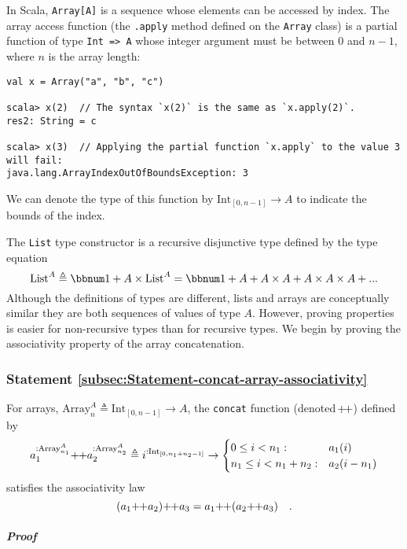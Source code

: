 In Scala, \lstinline!Array[A]! is a sequence whose elements can be
accessed by index. The array access function (the \lstinline!.apply!
method defined on the \lstinline!Array! class) is a partial function
of type \lstinline!Int => A! whose integer argument must be between
$0$ and $n-1$, where $n$ is the array length:
\begin{lstlisting}
val x = Array("a", "b", "c")

scala> x(2)  // The syntax `x(2)` is the same as `x.apply(2)`. 
res2: String = c

scala> x(3)  // Applying the partial function `x.apply` to the value 3 will fail:
java.lang.ArrayIndexOutOfBoundsException: 3
\end{lstlisting}
We can denote the type of this function by $\text{Int}_{[0,n-1]}\rightarrow A$
to indicate the bounds of the index.

The \lstinline!List! type constructor is a recursive disjunctive
type defined by the type equation
\[
\text{List}^{A}\triangleq\bbnum 1+A\times\text{List}^{A}=\bbnum 1+A+A\times A+A\times A\times A+...
\]
Although the definitions of types are different, lists and arrays
are conceptually similar \textemdash{} they are both sequences of
values of type $A$. However, proving properties is easier for non-recursive
types than for recursive types. We begin by proving the associativity
property of the array concatenation. 

\subsubsection{Statement \label{subsec:Statement-concat-array-associativity}\ref{subsec:Statement-concat-array-associativity}}

For arrays, $\text{Array}_{n}^{A}\triangleq\text{Int}_{[0,n-1]}\rightarrow A$,
the \lstinline!concat! function (denoted $\negmedspace+\!+$) defined
by
\[
a_{1}^{:\text{Array}_{n_{1}}^{A}}\negmedspace+\negthickspace+a_{2}^{:\text{Array}_{n_{2}}^{A}}\triangleq i^{:\text{Int}_{[0,n_{1}+n_{2}-1]}}\rightarrow\begin{cases}
0\leq i<n_{1}: & a_{1}(i)\\
n_{1}\leq i<n_{1}+n_{2}: & a_{2}(i-n_{1})
\end{cases}
\]
satisfies the associativity law
\[
(a_{1}\negmedspace+\negthickspace+a_{2})\negmedspace+\negthickspace+a_{3}=a_{1}\negmedspace+\negthickspace+(a_{2}\negmedspace+\negthickspace+a_{3})\quad.
\]


\subparagraph{Proof}

